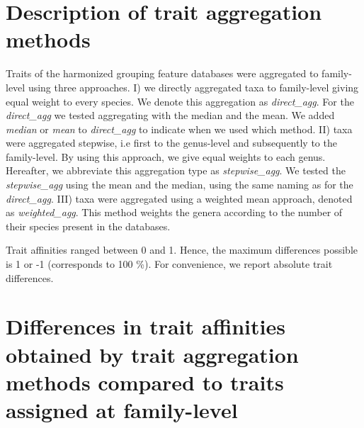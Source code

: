 \documentclass[../Draft_harmonization_paper.tex]{subfiles}
\begin{document}
\section{Description of trait aggregation methods}

Traits of the harmonized grouping feature databases were aggregated to family-level using three approaches. I) we directly aggregated taxa to family-level giving equal weight to every species. We denote this aggregation as \textit{direct\_agg}. For the \textit{direct\_agg} we tested aggregating with the median and the mean. We added \textit{median} or \textit{mean} to \textit{direct\_agg} to indicate when we used which method. II) taxa were aggregated stepwise, i.e first to the genus-level and subsequently to the family-level. By using this approach, we give equal weights to each genus. Hereafter, we abbreviate this aggregation type as \textit{stepwise\_agg}.
We tested the \textit{stepwise\_agg} using the mean and the median, using the same naming as for the \textit{direct\_agg}. III) taxa were aggregated using a weighted mean approach, denoted as \textit{weighted\_agg}. This method weights the genera according to the number of their species present in the databases.

Trait affinities ranged between 0 and 1. Hence, the maximum differences possible is 1 or -1 (corresponds to 100 \%). For convenience, we report absolute trait differences.

\section{Differences in trait affinities obtained by trait aggregation methods compared to traits assigned at family-level}
\label{sec:diff_trait_agg_chessman}
\end{document}
